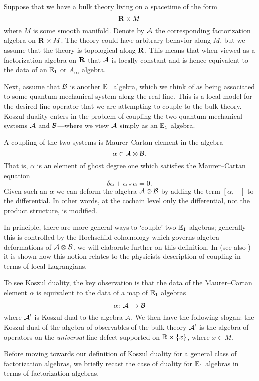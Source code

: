 \parsec[s:lines]
Suppose that we have a bulk theory living on a spacetime of the form 
\[
\mathbf{R} \times M 
\]
where $M$ is some smooth manifold. 
Denote by $\mathcal A$ the corresponding factorization algebra on $\mathbf{R} \times M$. 
The theory could have arbitrary behavior along $M$, but we assume that the theory is topological along $\mathbf{R}$. 
This means that when viewed as a factorization algebra on $\mathbf{R}$ that $\mathcal A$ is locally constant and is hence equivalent to the data of an $\mathbb E_1$ or $A_\infty$ algebra.

Next, assume that $\mathcal B$ is another $\mathbb E_1$ algebra, which we think of as being associated to some quantum mechanical system along the real line.
This is a local model for the desired line operator that we are attempting to couple to the bulk theory.
Koszul duality enters in the problem of coupling the two quantum mechanical systems $\mathcal A$ and $\mathcal B$---where we view $\mathcal A$ simply as an $\mathbb E_1$ algebra. 

A coupling of the two systems is Maurer--Cartan element in the algebra
\[
\alpha \in \mathcal A \otimes \mathcal B .
\]
That is, $\alpha$ is an element of ghost degree one which satisfies the Maurer--Cartan equation
\[
\delta \alpha + \alpha \star \alpha = 0 .
\]
Given such an $\alpha$ we can deform the algebra $\mathcal A \otimes \mathcal B$ by adding the term $[\alpha,-]$ to the differential. 
In other words, at the cochain level only the differential, not the product structure, is modified. 

In principle, there are more general ways to `couple' two $\mathbb E_1$ algebras; generally this is controlled by the Hochschild cohomology which governs algebra deformations of $\mathcal A \otimes \mathcal B$. 
we will elaborate further on this definition. 
In \cite{CG1} (see also \cite{PWkoszul}) it is shown how this notion relates to the physicists description of coupling in terms of local Lagrangians.

To see Koszul duality, the key observation is that the data of the Maurer--Cartan element $\alpha$ is equivalent to the data of a map of $\mathbb E_1$ algebras
\[
\alpha \colon \mathcal A^! \to \mathcal B 
\]
where $\mathcal A^!$ is Koszul dual to the algebra $\mathcal A$. 
We then have the following slogan: the Koszul dual of the algebra of observables of the bulk theory $\mathcal A^!$ is the algebra of operators on the {\em universal} line defect supported on $\mathbb R \times \{x\}$, where $x \in M$.  

\parsec[s:celine]

Before moving towards our definition of Koszul duality for a general class of factorization algebras, we briefly recast the case of duality for $\mathbb E_1$ algebras in terms of factorization algebras. 

